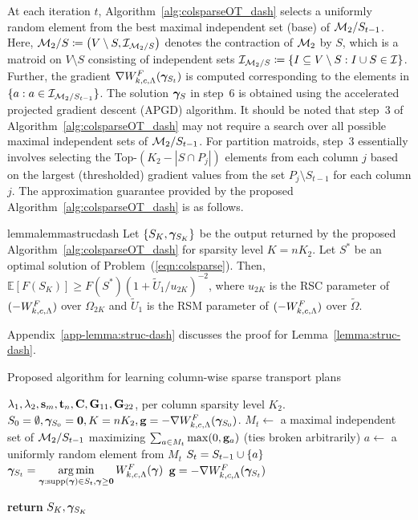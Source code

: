 At each iteration $t$, Algorithm~\ref{alg:colsparseOT_dash} selects a uniformly random element from the best maximal independent set (base) of $\mathcal{M}_2/S_{t-1}$. 
Here, $\mathcal{M}_2/S \coloneqq \left(V\setminus S, \mathcal{I}_{\mathcal{M}_2/S}\right)$ denotes the contraction of $\mathcal{M}_2$ by $S$, which is a matroid on $V\setminus S$ consisting of independent sets $\mathcal{I}_{\mathcal{M}_2/S} \coloneqq \{I \subseteq V\setminus S: I \cup S \in \mathcal{I} \}$. 
Further, the gradient $\nabla W^F_{k, c, \Lambda}(\bm{\gamma}_{S_{t}})$ is computed corresponding to the elements in $\{a: a\in \mathcal{I}_{\mathcal{M}_2/S_{t-1}}\}$. 
The solution $\bm{\gamma}_{S}$ in step~6 is obtained using the accelerated projected gradient descent (APGD)  algorithm. It should be noted that step~3 of Algorithm~\ref{alg:colsparseOT_dash} may not require a search over all possible maximal independent sets of $\mathcal{M}_2/S_{t-1}$. For partition matroids, step~3 essentially involves selecting the Top-$(K_2-|S\cap P_j|)$ elements from each column $j$ based on the largest (thresholded) gradient values from the set $P_j\setminus S_{t-1}$ for each column $j$.
The approximation guarantee provided by the proposed Algorithm~\ref{alg:colsparseOT_dash} is as follows. 
\begin{lemmaBox}
\begin{restatable}{lemma}{lemmastrucdash}\label{lemma:struc-dash}
Let $\{S_K,\bm{\gamma}_{S_K}\}$ be the output returned by the proposed Algorithm~\ref{alg:colsparseOT_dash} for sparsity level $K=nK_2$. Let $S^{*}$ be an optimal solution of Problem~(\ref{eqn:colsparse}). Then, 
$\mathbb{E}[F(S_{K})]\geq F(S^*)\left(1+\tilde{U}_1/u_{2K}\right)^{-2}$, where $u_{2K}$ is the RSC parameter of $(-W^F_{k, c, \Lambda})$ over $\Omega_{2K}$ and $\tilde{U}_1$ is the RSM parameter of $(-W^F_{k, c, \Lambda})$ over $\tilde{\Omega}$.
\end{restatable}
\end{lemmaBox}
Appendix~\ref{app-lemma:struc-dash} discusses the proof for Lemma~\ref{lemma:struc-dash}.
\begin{algorithm}[t]
\caption[Proposed algorithm for learning column-wise sparse transport plans]{Proposed algorithm for learning column-wise sparse transport plans} \label{alg:colsparseOT_dash}
\begin{algorithmic}[1]
\Require  $\lambda_1, \lambda_2, \mathbf{s}_m, \mathbf{t}_n, \mathbf{C}, \mathbf{G}_{11}, \mathbf{G}_{22}$, per column sparsity level $K_2$.
\State $S_0=\emptyset, \bm{\gamma}_{S_0} = \mathbf{0}, K=nK_2,\mathbf{g} = -\nabla W^F_{k, c, \Lambda}(\bm{\gamma}_{S_0})$.
\State $M_t\leftarrow$ a maximal independent set of $\mathcal{M}_2/S_{t-1}$ maximizing $\sum_{a\in M_t}\max(0,\mathbf{g}_a)$ (ties broken arbitrarily)
\State $a\leftarrow$ a uniformly random element from $M_t$
\State $S_t = S_{t-1}\cup \{a\}$
\State $\bm{\gamma}_{S_t} = \mathop{\rm arg\,min}\limits_{\bm{\gamma}:\textup{supp}(\bm{\gamma})\in S_t,\bm{\gamma}\ge \mathbf{0}}{W^F_{k, c, \Lambda}(\bm{\gamma})}$ 
\State $\mathbf{g} = -\nabla W^F_{k, c, \Lambda}(\bm{\gamma}_{S_t})$

\EndFor
\State \textbf{return} $S_{K}, \bm{\gamma}_{S_{K}}$
\end{algorithmic}
\end{algorithm}

